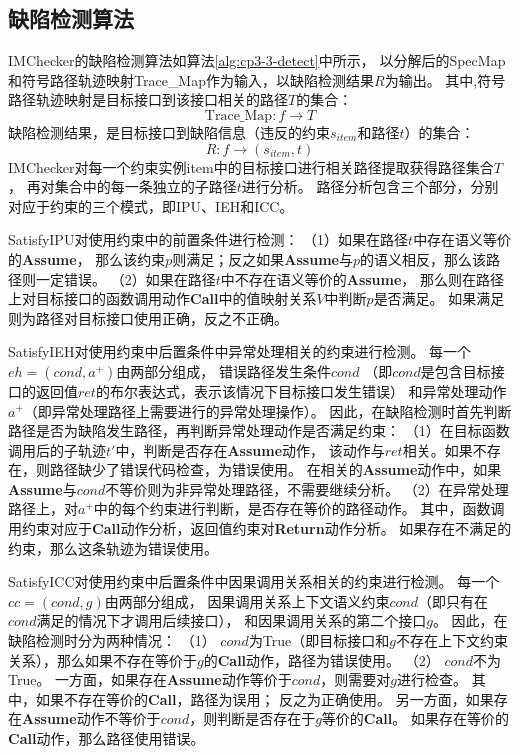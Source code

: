 

\subsection{缺陷检测算法}


IMChecker的缺陷检测算法如算法\ref{alg:cp3-3-detect}中所示，
以分解后的SpecMap和符号路径轨迹映射Trace\_Map作为输入，以缺陷检测结果$R$为输出。
其中,符号路径轨迹映射是目标接口到该接口相关的路径$T$的集合：
$$\text{Trace\_Map}: f \rightarrow T$$
缺陷检测结果，是目标接口到缺陷信息（违反的约束$s_{item}$和路径$t$）的集合：
$$R: f \rightarrow (s_{item}, t)$$
IMChecker对每一个约束实例item中的目标接口进行相关路径提取获得路径集合$T$，
再对集合中的每一条独立的子路径$t$进行分析。
路径分析包含三个部分，分别对应于约束的三个模式，即IPU、IEH和ICC。

SatisfyIPU对使用约束中的前置条件进行检测：
（1）如果在路径$t$中存在语义等价的\textbf{Assume}，
那么该约束$p$则满足；反之如果\textbf{Assume}与$p$的语义相反，那么该路径则一定错误。
（2）如果在路径$t$中不存在语义等价的\textbf{Assume}，
那么则在路径上对目标接口的函数调用动作\textbf{Call}中的值映射关系$V$中判断$p$是否满足。
如果满足则为路径对目标接口使用正确，反之不正确。

SatisfyIEH对使用约束中后置条件中异常处理相关的约束进行检测。
每一个$eh=(cond, a^+)$由两部分组成，
错误路径发生条件$cond$
（即$cond$是包含目标接口的返回值$ret$的布尔表达式，表示该情况下目标接口发生错误）
和异常处理动作$a^+$（即异常处理路径上需要进行的异常处理操作）。
因此，在缺陷检测时首先判断路径是否为缺陷发生路径，再判断异常处理动作是否满足约束：
（1）在目标函数调用后的子轨迹$t'$中，判断是否存在\textbf{Assume}动作，
该动作与$ret$相关。如果不存在，则路径缺少了错误代码检查，为错误使用。
在相关的\textbf{Assume}动作中，如果\textbf{Assume}与$cond$不等价则为非异常处理路径，不需要继续分析。
（2）在异常处理路径上，对$a^+$中的每个约束进行判断，是否存在等价的路径动作。
其中，函数调用约束对应于\textbf{Call}动作分析，返回值约束对\textbf{Return}动作分析。
如果存在不满足的约束，那么这条轨迹为错误使用。

SatisfyICC对使用约束中后置条件中因果调用关系相关的约束进行检测。
每一个$cc=(cond, g)$由两部分组成，
因果调用关系上下文语义约束$cond$（即只有在$cond$满足的情况下才调用后续接口），
和因果调用关系的第二个接口$g$。
因此，在缺陷检测时分为两种情况：
（1）
$cond$为True（即目标接口和$g$不存在上下文约束关系），那么如果不存在等价于$g$的\textbf{Call}动作，路径为错误使用。
（2）
$cond$不为True。
一方面，如果存在\textbf{Assume}动作等价于$cond$，则需要对$g$进行检查。
其中，如果不存在等价的\textbf{Call}，路径为误用；
反之为正确使用。
另一方面，如果存在\textbf{Assume}动作不等价于$cond$，则判断是否存在于$g$等价的\textbf{Call}。
如果存在等价的\textbf{Call}动作，那么路径使用错误。

